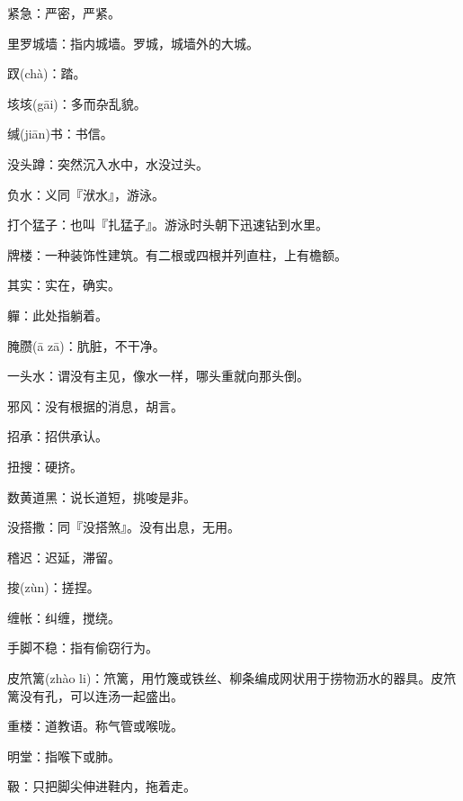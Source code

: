 \startbuffer[1335]
紧急：严密，严紧。
\stopbuffer


\startbuffer[1336]
里罗城墙：指内城墙。罗城，城墙外的大城。
\stopbuffer


\startbuffer[1337]
䟕(chà)：踏。
\stopbuffer


\startbuffer[1338]
垓垓(gāi)：多而杂乱貌。
\stopbuffer


\startbuffer[1339]
缄(jiān)书：书信。
\stopbuffer


\startbuffer[1340]
没头蹲：突然沉入水中，水没过头。
\stopbuffer


\startbuffer[1341]
负水：义同『洑水』，游泳。
\stopbuffer


\startbuffer[1342]
打个猛子：也叫『扎猛子』。游泳时头朝下迅速钻到水里。
\stopbuffer


\startbuffer[1343]
牌楼：一种装饰性建筑。有二根或四根并列直柱，上有檐额。
\stopbuffer


\startbuffer[1344]
其实：实在，确实。
\stopbuffer


\startbuffer[1345]
軃：此处指躺着。
\stopbuffer


\startbuffer[1346]
腌臜(ā zā)：肮脏，不干净。
\stopbuffer


\startbuffer[1347]
一头水：谓没有主见，像水一样，哪头重就向那头倒。
\stopbuffer


\startbuffer[1348]
邪风：没有根据的消息，胡言。
\stopbuffer


\startbuffer[1349]
招承：招供承认。
\stopbuffer


\startbuffer[1350]
扭搜：硬挤。
\stopbuffer


\startbuffer[1351]
数黄道黑：说长道短，挑唆是非。
\stopbuffer


\startbuffer[1352]
没搭撒：同『没搭煞』。没有出息，无用。
\stopbuffer


\startbuffer[1353]
稽迟：迟延，滞留。
\stopbuffer


\startbuffer[1354]
捘(zùn)：搓捏。
\stopbuffer


\startbuffer[1355]
缠帐：纠缠，搅绕。
\stopbuffer


\startbuffer[1356]
手脚不稳：指有偷窃行为。
\stopbuffer


\startbuffer[1357]
皮笊篱(zhào li)：笊篱，用竹篾或铁丝、柳条编成网状用于捞物沥水的器具。皮笊篱没有孔，可以连汤一起盛出。
\stopbuffer


\startbuffer[1358]
重楼：道教语。称气管或喉咙。
\stopbuffer


\startbuffer[1359]
明堂：指喉下或肺。
\stopbuffer


\startbuffer[1360]
靸：只把脚尖伸进鞋内，拖着走。
\stopbuffer


